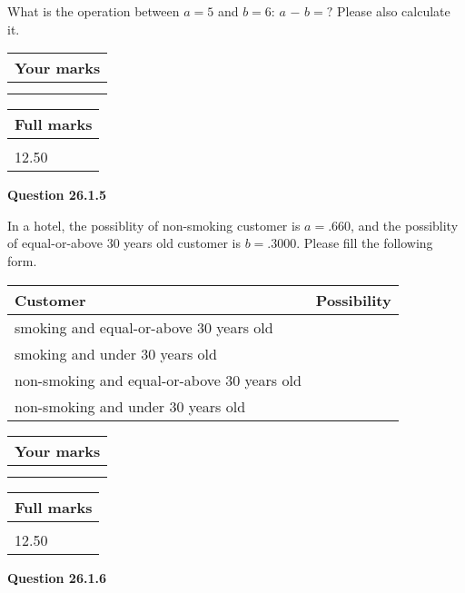 \documentclass[12pt]{article}
\begin{document}
  
What is the operation between $a= %
5$ and $b= %
6$:
$a$  %
$-$ $b=?$ Please also calculate it.

 
\vspace{0.3in}
  
\vspace{0.2in}
  
         \begin{tabular}{|l|}
\hline
 Your marks  \\
\hline
 \\ 
 \\ 
\hline
\end{tabular}
\hspace{0.05in} \begin{tabular}{|l|}
\hline
 Full marks  \\
\hline
 \\ 
12.50 \\
\hline
\end{tabular}
{\textbf{\Large{Question
26.1.5 
}}}
  
  
In a hotel, the possiblity of  %
non-smoking customer is
$a =  %
.660$, and the possiblity of  %
equal-or-above 30 years old customer is $ b =  %
.3000$.
Please fill the following form.
 
\noindent
\begin{tabular}{|l|l|}
\hline
Customer & Possibility \\
\hline
smoking  and   %
equal-or-above 30 years old  & \\
\hline
smoking  and   %
under 30 years old & \\
\hline
 non-smoking and   %
equal-or-above 30 years old  & \\
\hline
 non-smoking and  %
under 30 years old & \\
\hline
\end{tabular}
 
 
 

 

 
\vspace{0.3in}
  
\vspace{0.2in}
  
         \begin{tabular}{|l|}
\hline
 Your marks  \\
\hline
 \\ 
 \\ 
\hline
\end{tabular}
\hspace{0.05in} \begin{tabular}{|l|}
\hline
 Full marks  \\
\hline
 \\ 
12.50 \\
\hline
\end{tabular}
{\textbf{\Large{Question
26.1.6 
}}}
  
\end{document}
